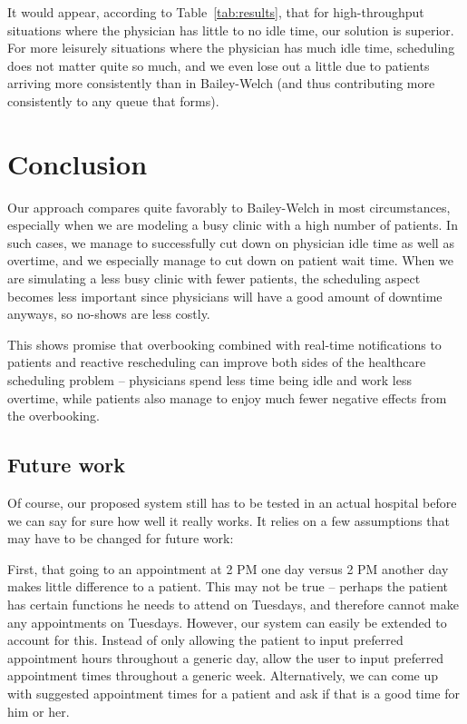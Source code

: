 \documentclass{article} %
\begin{document}
It would appear, according to Table~\ref{tab:results}, that for high-throughput situations where the physician has little to no idle time, our solution is superior. For more leisurely situations where the physician has much idle time, scheduling does not matter quite so much, and we even lose out a little due to patients arriving more consistently than in Bailey-Welch (and thus contributing more consistently to any queue that forms).

\section{Conclusion}

Our approach compares quite favorably to Bailey-Welch in most circumstances, especially when we are modeling a busy clinic with a high number of patients. In such cases, we manage to successfully cut down on physician idle time as well as overtime, and we especially manage to cut down on patient wait time. When we are simulating a less busy clinic with fewer patients, the scheduling aspect becomes less important since physicians will have a good amount of downtime anyways, so no-shows are less costly.

This shows promise that overbooking combined with real-time notifications to patients and reactive rescheduling can improve both sides of the healthcare scheduling problem -- physicians spend less time being idle and work less overtime, while patients also manage to enjoy much fewer negative effects from the overbooking.

\subsection{Future work}

Of course, our proposed system still has to be tested in an actual hospital before we can say for sure how well it really works. It relies on a few assumptions that may have to be changed for future work:

First, that going to an appointment at 2 PM one day versus 2 PM another day makes little difference to a patient. This may not be true -- perhaps the patient has certain functions he needs to attend on Tuesdays, and therefore cannot make any appointments on Tuesdays. However, our system can easily be extended to account for this. Instead of only allowing the patient to input preferred appointment hours throughout a generic day, allow the user to input preferred appointment times throughout a generic week. Alternatively, we can come up with suggested appointment times for a patient and ask if that is a good time for him or her.
\end{document}
